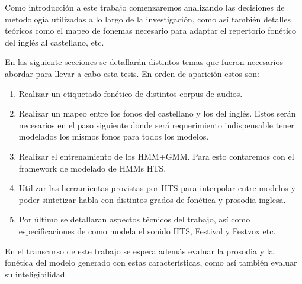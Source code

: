 \noindent Como introducción a este trabajo comenzaremos analizando las decisiones de metodología utilizadas a lo largo de la investigación, como así también detalles teóricos como el mapeo de fonemas necesario para adaptar el repertorio fonético del inglés al castellano, etc.

\noindent En las siguiente secciones se detallarán distintos temas que fueron necesarios abordar para llevar a cabo esta tesis. En orden de aparición estos son:

\begin{enumerate}
\item Realizar un etiquetado fonético de distintos corpus de audios.

\item Realizar un mapeo entre los fonos del castellano y los del inglés. Estos serán necesarios en el paso siguiente donde será requerimiento indispensable tener modelados los mismos fonos para todos los modelos.

\item Realizar el entrenamiento de los HMM+GMM. Para esto contaremos con el framework de modelado de HMMs HTS. 

\item Utilizar las herramientas provistas por HTS para interpolar entre modelos y poder sintetizar habla con distintos grados de fonética y prosodia inglesa.

\item Por último se detallaran aspectos técnicos del trabajo, así como especificaciones de como modela el sonido HTS, Festival y Festvox etc. 

\end{enumerate}

\noindent En el transcurso de este trabajo se espera además evaluar la prosodia y la fonética del modelo generado con estas características, como así también evaluar su inteligibilidad. 
